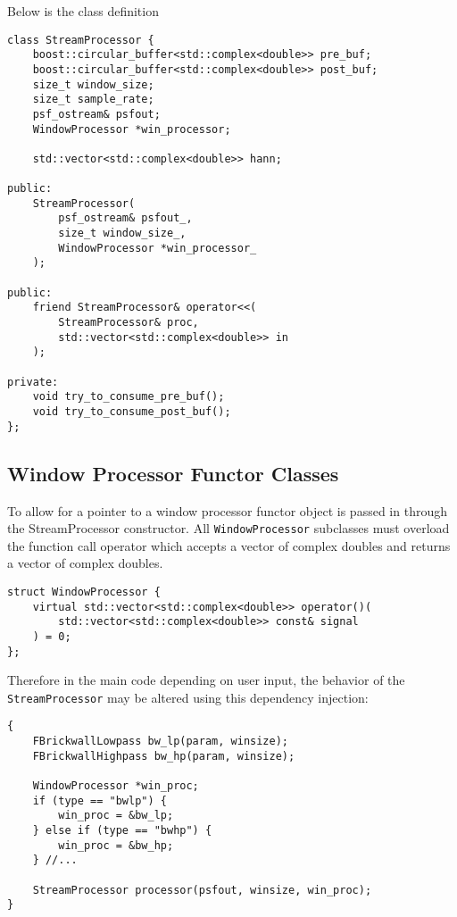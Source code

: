 Below is the class definition
\begin{verbatim}
class StreamProcessor {
    boost::circular_buffer<std::complex<double>> pre_buf;
    boost::circular_buffer<std::complex<double>> post_buf;
    size_t window_size;
    size_t sample_rate;
    psf_ostream& psfout;
    WindowProcessor *win_processor;

    std::vector<std::complex<double>> hann;

public:
    StreamProcessor(   
        psf_ostream& psfout_, 
        size_t window_size_,
        WindowProcessor *win_processor_
    );

public:
    friend StreamProcessor& operator<<(
        StreamProcessor& proc, 
        std::vector<std::complex<double>> in
    );

private:
    void try_to_consume_pre_buf();
    void try_to_consume_post_buf();
};
\end{verbatim}

\pagebreak

\subsection{Window Processor Functor Classes}
To allow for 
a pointer to a window processor functor object is passed in through the StreamProcessor constructor.
All \verb|WindowProcessor| subclasses must overload the function call operator which 
accepts a vector of complex doubles and returns a vector of complex doubles.

\begin{verbatim}
struct WindowProcessor {
    virtual std::vector<std::complex<double>> operator()(
        std::vector<std::complex<double>> const& signal
    ) = 0;
};
\end{verbatim}

Therefore in the main code depending on user input, the behavior of the \verb|StreamProcessor|
may be altered using this dependency injection:

\begin{verbatim}
{
    FBrickwallLowpass bw_lp(param, winsize);
    FBrickwallHighpass bw_hp(param, winsize);

    WindowProcessor *win_proc;
    if (type == "bwlp") {
        win_proc = &bw_lp;
    } else if (type == "bwhp") {
        win_proc = &bw_hp;
    } //...

    StreamProcessor processor(psfout, winsize, win_proc);
}
\end{verbatim}

